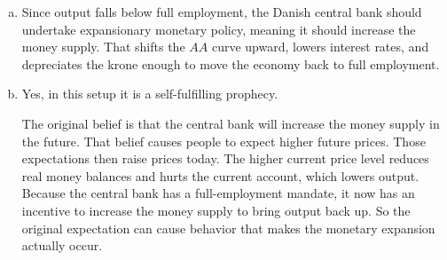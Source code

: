 \documentclass[11pt]{article}
\newenvironment{problem}[2][Problem]{\begin{trivlist}
\item[\hskip \labelsep {\bfseries #1}\hskip \labelsep {\bfseries #2.}]
\leavevmode\par
}{\end{trivlist}}
\begin{document}
\begin{problem}{2}
\begin{enumerate}[(a)]
\item Since output falls below full employment, the Danish central bank should undertake expansionary monetary policy, meaning it should increase the money supply. That shifts the \(AA\) curve upward, lowers interest rates, and depreciates the krone enough to move the economy back to full employment.

\item Yes, in this setup it is a self-fulfilling prophecy.

The original belief is that the central bank will increase the money supply in the future. That belief causes people to expect higher future prices. Those expectations then raise prices today. The higher current price level reduces real money balances and hurts the current account, which lowers output. Because the central bank has a full-employment mandate, it now has an incentive to increase the money supply to bring output back up. So the original expectation can cause behavior that makes the monetary expansion actually occur.

\end{enumerate}

\end{problem}
\end{document}
